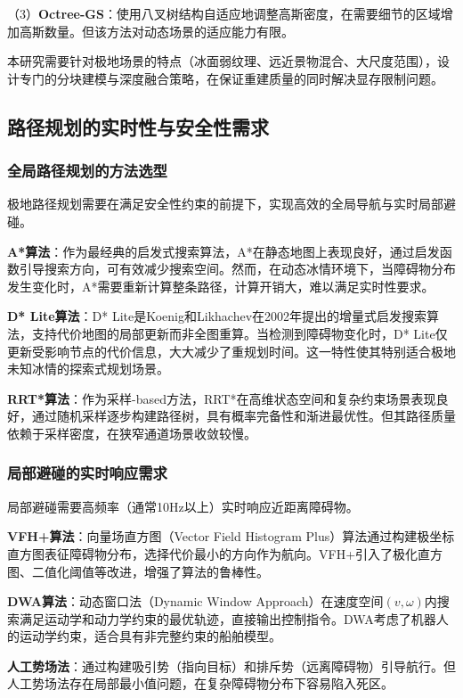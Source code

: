 \documentclass[12pt,a4paper]{ctexbook}
\begin{document}
（3）\textbf{Octree-GS}：使用八叉树结构自适应地调整高斯密度，在需要细节的区域增加高斯数量。但该方法对动态场景的适应能力有限。

本研究需要针对极地场景的特点（冰面弱纹理、远近景物混合、大尺度范围），设计专门的分块建模与深度融合策略，在保证重建质量的同时解决显存限制问题。

\subsection{路径规划的实时性与安全性需求}

\subsubsection{全局路径规划的方法选型}

极地路径规划需要在满足安全性约束的前提下，实现高效的全局导航与实时局部避碰。

\textbf{A*算法}：作为最经典的启发式搜索算法，A*在静态地图上表现良好，通过启发函数引导搜索方向，可有效减少搜索空间。然而，在动态冰情环境下，当障碍物分布发生变化时，A*需要重新计算整条路径，计算开销大，难以满足实时性要求。

\textbf{D* Lite算法}：D* Lite是Koenig和Likhachev在2002年提出的增量式启发搜索算法，支持代价地图的局部更新而非全图重算。当检测到障碍物变化时，D* Lite仅更新受影响节点的代价信息，大大减少了重规划时间。这一特性使其特别适合极地未知冰情的探索式规划场景。

\textbf{RRT*算法}：作为采样-based方法，RRT*在高维状态空间和复杂约束场景表现良好，通过随机采样逐步构建路径树，具有概率完备性和渐进最优性。但其路径质量依赖于采样密度，在狭窄通道场景收敛较慢。

\subsubsection{局部避碰的实时响应需求}

局部避碰需要高频率（通常10Hz以上）实时响应近距离障碍物。

\textbf{VFH+算法}：向量场直方图（Vector Field Histogram Plus）算法通过构建极坐标直方图表征障碍物分布，选择代价最小的方向作为航向。VFH+引入了极化直方图、二值化阈值等改进，增强了算法的鲁棒性。

\textbf{DWA算法}：动态窗口法（Dynamic Window Approach）在速度空间$(v, \omega)$内搜索满足运动学和动力学约束的最优轨迹，直接输出控制指令。DWA考虑了机器人的运动学约束，适合具有非完整约束的船舶模型。

\textbf{人工势场法}：通过构建吸引势（指向目标）和排斥势（远离障碍物）引导航行。但人工势场法存在局部最小值问题，在复杂障碍物分布下容易陷入死区。
\end{document}
